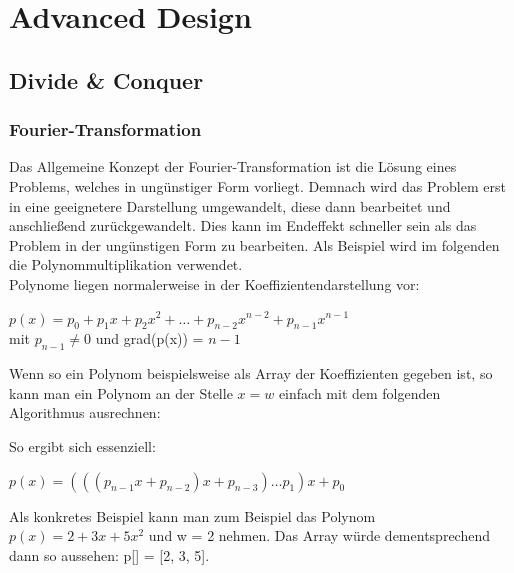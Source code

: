 \documentclass[
../../AuD-Zusammenfassung.tex,
]
{subfiles}
\begin{document}
\section{Advanced Design}
\subsection{Divide \& Conquer}
\subsubsection{Fourier-Transformation}
Das Allgemeine Konzept der Fourier-Transformation ist die Lösung eines Problems, welches in ungünstiger Form vorliegt. Demnach wird das Problem erst in eine geeignetere Darstellung umgewandelt, diese dann bearbeitet und anschließend zurückgewandelt. Dies kann im Endeffekt schneller sein als das Problem in der ungünstigen Form zu bearbeiten. Als Beispiel wird im folgenden die Polynommultiplikation verwendet.\\
Polynome liegen normalerweise in der Koeffizientendarstellung vor:
\begin{center}
    $p(x) = p_0 + p_1x + p_2x^2 + \ldots + p_{n-2}x^{n-2} + p_{n-1}x^{n-1}$\\
    mit $p_{n-1} \not= 0$ und grad(p(x)) = $n - 1$
\end{center}
Wenn so ein Polynom beispielsweise als Array der Koeffizienten gegeben ist, so kann man ein Polynom an der Stelle $x = w$ einfach mit dem folgenden Algorithmus ausrechnen:\\
\begin{algorithm}[H]
\end{algorithm}
So ergibt sich essenziell:
\begin{center}
    $p(x) = (((p_{n-1}x + p_{n-2})x + p_{n-3})\ldots p_1)x + p_0$
\end{center}
Als konkretes Beispiel kann man zum Beispiel das Polynom $p(x) = 2 + 3x + 5x^2$ und w = 2 nehmen. Das Array würde dementsprechend dann so aussehen: p[] = [2, 3, 5].
\end{document}
